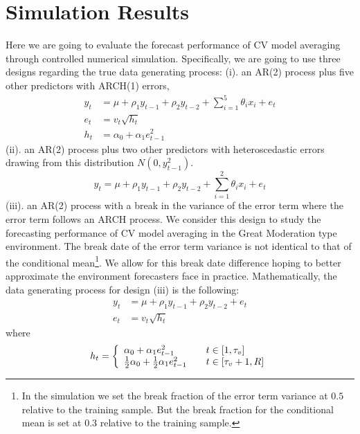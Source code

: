 \section{Simulation Results}
Here we are going to evaluate the forecast performance of CV model averaging through controlled numerical simulation. Specifically, we are going to use three designs regarding the true data generating process: (i). an AR(2) process plus five other predictors with ARCH(1) errors,
\begin{subequations}
            \begin{align}
                y_{t} & = \mu + \rho_{1}y_{t-1} + \rho_{2}y_{t-2} + \sum_{i=1}^{5}\theta_{i}x_{i} + e_{t} \\
                e_{t} & = v_{t}\sqrt{h_{t}}\\
                h_{t} & = \alpha_{0} + \alpha_{1}e_{t-1}^2
            \end{align}
\end{subequations}
(ii). an AR(2) process plus two other predictors with heteroscedastic errors drawing from this distribution $N(0,y_{t-1}^2)$.
\begin{equation}
                y_{t} = \mu + \rho_{1}y_{t-1} + \rho_{2}y_{t-2} + \sum_{i=1}^{2}\theta_{i}x_{i} + e_{t}
\end{equation}
(iii). an AR(2) process with a break in the variance of the error term where the error term follows an ARCH process. We consider this design to study the forecasting performance of CV model averaging in the Great Moderation type environment. The break date of the error term variance is not identical to that of the conditional mean\footnote{In the simulation we set the break fraction of the error term variance at $0.5$ relative to the training sample. But the break fraction for the conditional mean is set at $0.3$ relative to the training sample.}. We allow for this break date difference hoping to better approximate the environment forecasters face in practice. Mathematically, the data generating process for design (iii) is the following:
\begin{subequations}
            \begin{align}
                y_{t} & = \mu + \rho_{1}y_{t-1} + \rho_{2}y_{t-2} + e_{t} \\
                e_{t} & = v_{t}\sqrt{h_{t}}
            \end{align}
\end{subequations}
where
\[ h_{t} = \left\{
  \begin{array}{l l}
    \alpha_{0} + \alpha_{1}e_{t-1}^2 & \quad t \in [1,\tau_{v}]\\
    \frac{1}{2} \alpha_{0} + \frac{1}{2} \alpha_{1}e_{t-1}^2 & \quad t \in [\tau_{v}+1, R]
\end{array} \right.\]
